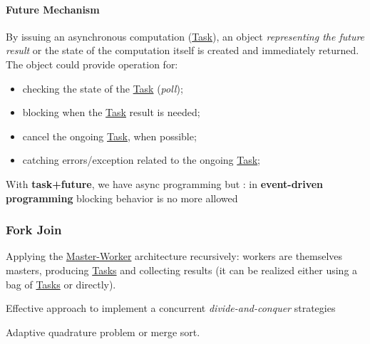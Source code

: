 \paragraph{Future Mechanism}\label{par:ed_future_mechanism} %
By issuing an asynchronous computation (\hyperref[def:task]{Task}), an object \textit{representing the future result} or the state of the computation itself is created and immediately returned.
\\
The object could provide operation for:
\begin{itemize}
    \item checking the state of the \hyperref[def:task]{Task} (\textit{poll});
    \item blocking when the \hyperref[def:task]{Task} result is needed;
    \item cancel the ongoing \hyperref[def:task]{Task}, when possible;
    \item catching errors/exception related to the ongoing \hyperref[def:task]{Task};
\end{itemize}
\begin{note}
    With \textbf{task+future}, we have async programming but : in \textbf{event-driven programming} blocking behavior is no more allowed
\end{note}
%
\subsubsection{Fork Join}\label{sub:ed_fork_join} %
Applying the \hyperref[sub:ed_master_workers]{Master-Worker} architecture recursively: workers are themselves masters, producing \hyperref[def:task]{Tasks} and collecting results (it can be realized either using a bag of \hyperref[def:task]{Tasks} or directly).
\begin{note}
    Effective approach to implement a concurrent \textit{divide-and-conquer} strategies
\end{note}
\begin{example}{}{}
    Adaptive quadrature problem or merge sort.
\end{example}
%
